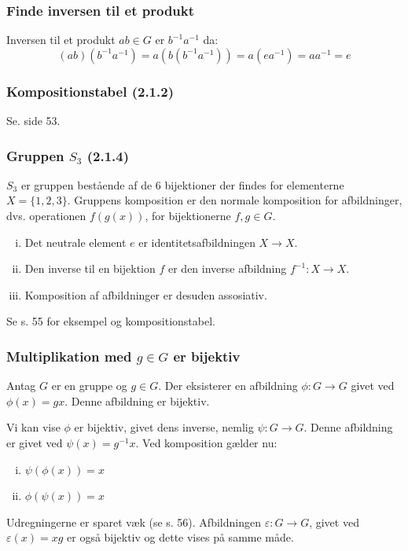 \subsubsection{Finde inversen til et produkt}
Inversen til et produkt $ab \in G$ er $b^{-1}a^{-1}$ da:
\begin{equation*}
  (ab)(b^{-1}a^{-1}) = a(b(b^{-1}a^{-1})) = a(ea^{-1}) = aa^{-1} = e
\end{equation*}

\subsubsection{Kompositionstabel (2.1.2)}
Se. side 53.

\subsubsection{Gruppen $S_3$ (2.1.4)}
\label{S_3}
$S_3$ er gruppen bestående af de 6 bijektioner der findes for elementerne
$X = \{1,2,3\}$. Gruppens komposition er den normale komposition for
afbildninger, dvs. operationen $f(g(x))$, for bijektionerne $f, g \in G$.
\begin{enumerate}[(i)]
  \item Det neutrale element $e$ er identitetsafbildningen $X \rightarrow X$.
  \item Den inverse til en bijektion $f$ er den inverse afbildning $f^{-1}: X
  \rightarrow X$.
  \item Komposition af afbildninger er desuden assosiativ.
\end{enumerate}
Se s. 55 for eksempel og kompositionstabel.

\subsubsection{Multiplikation med $g \in G$ er bijektiv}
Antag $G$ er en gruppe og $g \in G$. Der eksisterer en afbildning
$\phi:G\rightarrow G$ givet ved $\phi(x) = gx$. Denne afbildning er bijektiv.

Vi kan vise $\phi$ er bijektiv, givet dens inverse, nemlig $\psi: G
\rightarrow G$. Denne afbildning er givet ved $\psi(x) = g^{-1}x$. Ved
komposition gælder nu:
\begin{enumerate}[(i)]
  \item $\psi(\phi(x)) = x$
  \item $\phi(\psi(x)) = x$
\end{enumerate}
Udregningerne er sparet væk (se s. 56). Afbildningen $\varepsilon : G
\rightarrow G$, givet ved $\varepsilon(x) = xg$ er også bijektiv og dette vises
på samme måde.

